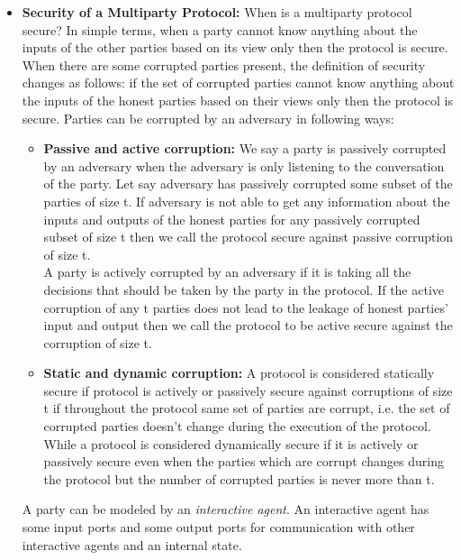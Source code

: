 \documentclass{llncs}
\begin{document}
\begin{itemize}
\item \textbf{Security of a Multiparty Protocol:} When is a multiparty protocol secure? In simple terms, when a party cannot know anything about the inputs of the other parties based on its view only then the protocol is secure. When there are some corrupted parties present, the definition of security changes as follows: if the set of corrupted parties cannot know anything about the inputs of the honest parties based on their views only then the protocol is secure. Parties can be corrupted by an adversary in following ways:
\begin{itemize}
\item \textbf{Passive and active corruption:} We say a party is passively corrupted by an adversary when the adversary is only listening to the conversation of the party. Let say adversary has passively corrupted some subset of the parties of size t. If adversary is not able to get any information about the inputs and outputs of the honest parties for any passively corrupted subset of size t then we call the protocol secure against passive corruption of size t.\\
A party is actively corrupted by an adversary if it is taking all the decisions that should be taken by the party in the protocol. If the active corruption of any t parties does not lead to the leakage of honest parties' input and output then we call the protocol to be active secure against the corruption of size t.

\item \textbf{Static and dynamic corruption:} A protocol is considered statically secure if protocol is actively or passively secure against corruptions of size t if throughout the protocol same set of parties are corrupt, i.e. the set of corrupted parties doesn't change during the execution of the protocol.\\
While a protocol is considered dynamically secure if it is actively or passively secure even when the parties which are corrupt changes during the protocol but the number of corrupted parties is never more than t.\\
\end{itemize}

A party can be modeled by an \textit{interactive agent}. An interactive agent has some input ports and some output ports for communication with other interactive agents and an internal state.\newline


\end{itemize}
\end{document}
